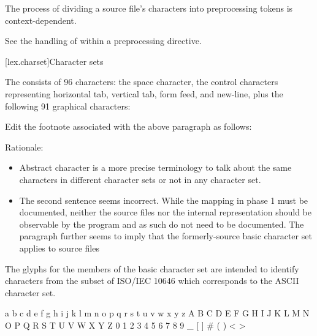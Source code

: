 \documentclass{wg21}
\begin{document}
\begin{enumerate}
The process of dividing a source file's
characters into preprocessing tokens is context-dependent.
\begin{example}
    See the handling of \tcode{<} within a  preprocessing
    directive.
\end{example}

\end{enumerate}

[lex.charset]{Character sets}



\pnum
{}%
The  consists of 96 characters: the space character,
the control characters representing horizontal tab, vertical tab, form feed, and
new-line, plus the following 91 graphical characters:

\begin{quoteblock}
Edit the footnote associated with the above paragraph as follows:

Rationale:
\begin{itemize}
\item Abstract character is a more precise terminology to talk about the same characters in different character sets or not in any character set.
\item The second sentence seems incorrect. While the mapping in phase 1 must be documented, neither the source files nor the internal representation should be observable by the program and as such do not need to be documented. The paragraph further seems to imply that the formerly-source basic character set applies to source files
\end{itemize}

\begin{quoteblock}
The glyphs for
the members of the basic  character set are intended to
identify  characters from the subset of ISO/IEC 10646 which corresponds to the ASCII
character set. 
\end{quoteblock}
\end{quoteblock}

\begin{codeblock}
    a b c d e f g h i j k l m n o p q r s t u v w x y z
    A B C D E F G H I J K L M N O P Q R S T U V W X Y Z
    0 1 2 3 4 5 6 7 8 9
    _ { } [ ] # ( ) < > %
\end{codeblock}
\end{document}
